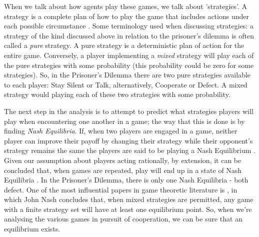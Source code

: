 \documentclass[11pt]{article}
\newcommand*{\np}{\par\noindent\newline}
\begin{document}
\np When we talk about how agents play these games, we talk about 'strategies'. A strategy is a complete plan of how to
play the game that includes actions under each possible circumstance \citep{angner_course_2012}. Some terminology used
when discussing strategies: a strategy of the kind discussed above in relation to the prisoner's dilemma is often called
a \textit{pure} strategy. A pure strategy is a deterministic plan of action for the entire game. Conversely, a player implementing a \textit{mixed} strategy will play each of the pure strategies with some probability (this
probability could be zero for some strategies). So, in the Prisoner's Dilemma there are two pure strategies available to
each player: Stay Silent or Talk, alternatively, Cooperate or Defect. A mixed strategy would playing each of these two
strategies with some probability.

\np The next step in the analysis is to attempt to predict what strategies players will play when encountering one
another in a game; the way that this is done is by finding \textit{Nash Equilibria}. If, when two players are engaged in
a game, neither player can improve their payoff by changing their strategy while their opponent's strategy remains the
same the players are said to be playing a Nash Equilibrium \citep{angner_course_2012}. Given our assumption about
players acting rationally, by extension, it can be concluded that, when games are repeated, play will end up in a state
of Nash Equilibria \citep{kalai_rational_1993}. In the Prisoner's Dilemma, there is only one Nash Equilibria - both
defect. One of the most influential papers in game theoretic literature is \citep{nash_equilibrium_1950}, in which John
Nash concludes that, when mixed strategies are permitted, any game with a finite strategy set will have at least one equilibrium point. So, when we're analysing the various games in pursuit of cooperation, we can be sure that an equilibrium exists.
\end{document}

